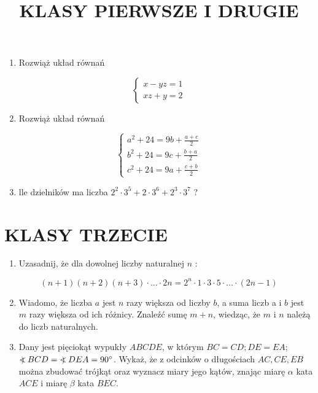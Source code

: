 \documentclass[10pt]{article}
\title{KLASY PIERWSZE I DRUGIE }
\author{}
\date{}
\newcommand\Varangle{\mathop{{<\!\!\!\!\!\text{\small)}}\:}\nolimits}
\begin{document}
\maketitle
\begin{enumerate}
  \item Rozwiąż układ równań
\end{enumerate}

\[
\left\{\begin{array}{l}
x-y z=1 \\
x z+y=2
\end{array}\right.
\]

\begin{enumerate}
  \setcounter{enumi}{1}
  \item Rozwiąż układ równań
\end{enumerate}

\[
\left\{\begin{array}{l}
a^{2}+24=9 b+\frac{a+c}{2} \\
b^{2}+24=9 c+\frac{b+a}{2} \\
c^{2}+24=9 a+\frac{c+b}{2}
\end{array}\right.
\]

\begin{enumerate}
  \setcounter{enumi}{2}
  \item lle dzielników ma liczba \(2^{2} \cdot 3^{5}+2 \cdot 3^{6}+2^{3} \cdot 3^{7}\) ?
\end{enumerate}

\section*{KLASY TRZECIE}
\begin{enumerate}
  \item Uzasadnij, że dla dowolnej liczby naturalnej \(n\) :
\end{enumerate}

\[
(n+1)(n+2)(n+3) \cdot \ldots \cdot 2 n=2^{n} \cdot 1 \cdot 3 \cdot 5 \cdot \ldots \cdot(2 n-1)
\]

\begin{enumerate}
  \setcounter{enumi}{1}
  \item Wiadomo, że liczba \(a\) jest \(n\) razy większa od liczby \(b\), a suma liczb a i \(b\) jest \(m\) razy większa od ich różnicy. Znaleźć sumę \(m+n\), wiedząc, że \(m\) i \(n\) należą do liczb naturalnych.
  \item Dany jest pięciokąt wypukły \(A B C D E\), w którym \(B C=C D ; D E=E A\);\\
\(\Varangle B C D=\Varangle D E A=90^{\circ}\). Wykaż, że z odcinków o długościach \(A C, C E, E B\) można zbudować trójkąt oraz wyznacz miary jego kątów, znając miarę \(\alpha\) kata \(A C E\) i miarę \(\beta\) kata \(B E C\).
\end{enumerate}
\end{document}
